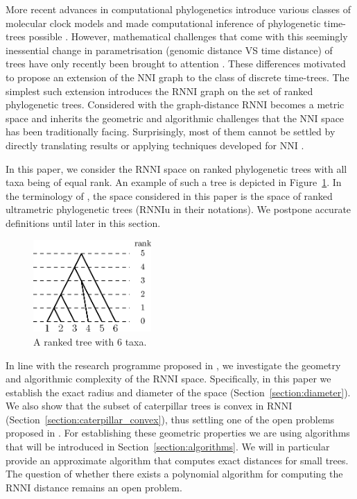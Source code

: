 \documentclass{amsart}
\newcommand{\nni}{\mathrm{NNI}}
\newcommand{\rnni}{\mathrm{RNNI}}
\newcommand{\rnniu}{\mathrm{RNNIu}}
\begin{document}
More recent advances in computational phylogenetics introduce various classes of molecular clock models \autocite{Yoder2000-ks,Drummond2006-nl,Drummond2010-yf} and made computational inference of phylogenetic time-trees possible \autocite{Ronquist2003-eq, Bouckaert2018-yr, Hadfield2018-xp}.
However, mathematical challenges that come with this seemingly inessential change in parametrisation (genomic distance VS time distance) of trees have only recently been brought to attention \autocite{Gavryushkin2016-uu}.
These differences motivated \textcite{Gavryushkin2018-ol} to propose an extension of the $\nni$ graph to the class of discrete time-trees.
The simplest such extension introduces the $\rnni$ graph on the set of ranked phylogenetic trees.
Considered with the graph-distance $\rnni$ becomes a metric space and inherits the geometric and algorithmic challenges that the $\nni$ space has been traditionally facing.
Surprisingly, most of them cannot be settled by directly translating results or applying techniques developed for $\nni$ \autocite{Gavryushkin2018-ol}.

In this paper, we consider the $\rnni$ space on ranked phylogenetic trees with all taxa being of equal rank.
An example of such a tree is depicted in Figure~\ref{fig:ranked_tree}.
In the terminology of \autocite{Gavryushkin2018-ol}, the space considered in this paper is the space of ranked ultrametric phylogenetic trees ($\rnniu$ in their notations).
We postpone accurate definitions until later in this section.

\begin{figure}[H]
\centering
\includegraphics[width=0.4\textwidth]{ranked_tree}
\vspace{12pt}
\caption{A ranked tree with $6$ taxa.}
\label{fig:ranked_tree}
\end{figure}

In line with the research programme proposed in \autocite{Gavryushkin2018-ol}, we investigate the geometry and algorithmic complexity of the $\rnni$ space.
Specifically, in this paper we establish the exact radius and diameter of the space (Section~\ref{section:diameter}).
We also show that the subset of caterpillar trees is convex in $\rnni$ (Section~\ref{section:caterpillar_convex}), thus settling one of the open problems proposed in \autocite{Gavryushkin2018-ol}.
For establishing these geometric properties we are using algorithms that will be introduced in Section~\ref{section:algorithms}.
We will in particular provide an approximate algorithm that computes exact distances for small trees.
The question of whether there exists a polynomial algorithm for computing the $\rnni$ distance remains an open problem.
\end{document}
